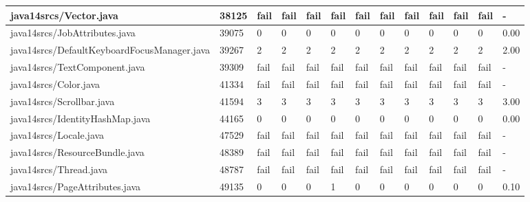 \begin{tabular}{|l|l|l|l|l|l|l|l|l|l|l|l|l|}
\hline
java14srcs/Vector.java                             & 38125       & fail      & fail      & fail      & fail      & fail      & fail      & fail      & fail      & fail      & fail      & -         \\
\hline
java14srcs/JobAttributes.java                      & 39075       & 0         & 0         & 0         & 0         & 0         & 0         & 0         & 0         & 0         & 0         & 0.00      \\
\hline
java14srcs/DefaultKeyboardFocusManager.java        & 39267       & 2         & 2         & 2         & 2         & 2         & 2         & 2         & 2         & 2         & 2         & 2.00      \\
\hline
java14srcs/TextComponent.java                      & 39309       & fail      & fail      & fail      & fail      & fail      & fail      & fail      & fail      & fail      & fail      & -         \\
\hline
java14srcs/Color.java                              & 41334       & fail      & fail      & fail      & fail      & fail      & fail      & fail      & fail      & fail      & fail      & -         \\
\hline
java14srcs/Scrollbar.java                          & 41594       & 3         & 3         & 3         & 3         & 3         & 3         & 3         & 3         & 3         & 3         & 3.00      \\
\hline
java14srcs/IdentityHashMap.java                    & 44165       & 0         & 0         & 0         & 0         & 0         & 0         & 0         & 0         & 0         & 0         & 0.00      \\
\hline
java14srcs/Locale.java                             & 47529       & fail      & fail      & fail      & fail      & fail      & fail      & fail      & fail      & fail      & fail      & -         \\
\hline
java14srcs/ResourceBundle.java                     & 48389       & fail      & fail      & fail      & fail      & fail      & fail      & fail      & fail      & fail      & fail      & -         \\
\hline
java14srcs/Thread.java                             & 48787       & fail      & fail      & fail      & fail      & fail      & fail      & fail      & fail      & fail      & fail      & -         \\
\hline
java14srcs/PageAttributes.java                     & 49135       & 0         & 0         & 0         & 1         & 0         & 0         & 0         & 0         & 0         & 0         & 0.10      \\

\end{tabular}
